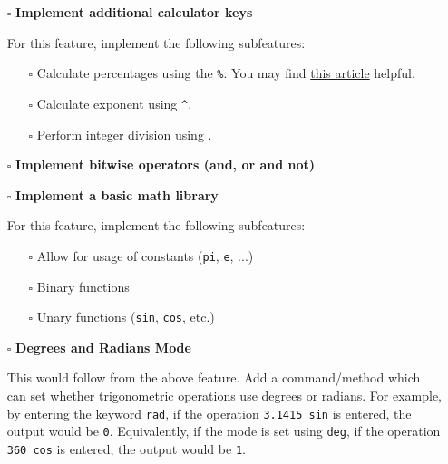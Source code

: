 \documentclass{article}
\begin{document}
\begin{itemize}
  \item[$\square$] \textbf{Implement additional calculator keys}
  
  For this feature, implement the following subfeatures:
	\begin{itemize}
	\item[$\square$] Calculate percentages using the \texttt{\%}. You may find \href{https://blogs.msdn.microsoft.com/oldnewthing/20080110-00/?p=23853}{this article} helpful.
	\end{itemize}
	\begin{itemize}
	\item[$\square$] Calculate exponent using \texttt{\^}.
	\end{itemize}
	\begin{itemize}
	\item[$\square$] Perform integer division using \texttt{\/\/}.
	\end{itemize}
\end{itemize}

\begin{itemize}
  \item[$\square$] \textbf{Implement bitwise operators (and, or and not)}
\end{itemize}

\begin{itemize}
  \item[$\square$] \textbf{Implement a basic math library}
  
  For this feature, implement the following subfeatures:
  \begin{itemize}
	\item[$\square$] Allow for usage of constants (\texttt{pi}, \texttt{e}, ...)
	\end{itemize}
	\begin{itemize}
	\item[$\square$] Binary functions
	\end{itemize}
	\begin{itemize}
	\item[$\square$] Unary functions (\texttt{sin}, \texttt{cos}, etc.)
	\end{itemize}
\end{itemize}

\begin{itemize}
  \item[$\square$] \textbf{Degrees and Radians Mode}
  
	This would follow from the above feature. Add a command/method which can set whether trigonometric operations use degrees or radians. For example, by entering the keyword \texttt{rad}, if the operation \texttt{3.1415 sin} is entered, the output would be \texttt{0}. Equivalently, if the mode is set using \texttt{deg}, if the operation \texttt{360 cos} is entered, the output would be \texttt{1}.\newline
\end{itemize}
\end{document}
